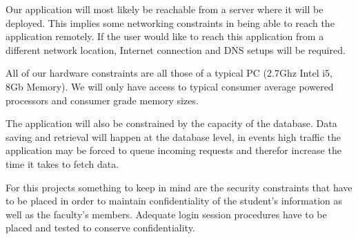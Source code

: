 
Our application will most likely be reachable from a server where it will be deployed. This implies some networking constraints in being able to reach the application remotely. If the user would like to reach this application from a different network location, Internet connection and DNS setups will be required. 

All of our hardware constraints are all those of a typical PC (2.7Ghz Intel i5, 8Gb Memory). We will only have access to typical consumer average powered processors and consumer grade memory sizes.

The application will also be constrained by the capacity of the database. Data saving and retrieval will happen at the database level, in events high traffic the application may be forced to queue incoming requests and therefor increase the time it takes to fetch data.

For this projects something to keep in mind are the security constraints that have to be placed in order to maintain confidentiality of the student’s information as well as the faculty’s members. Adequate login session procedures have to be placed and tested to conserve confidentiality.
